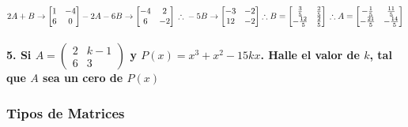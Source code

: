 \documentclass[
]{article}
\begin{document}
\[
2A + B \rightarrow \begin{bmatrix}1&-4\\6&0\end{bmatrix} - 2A-6B\rightarrow\begin{bmatrix}-4&2\\6&-2\end{bmatrix}
\\ \therefore \\
-5B \rightarrow\begin{bmatrix}
    -3&-2\\12&-2
\end{bmatrix} \therefore B = \begin{bmatrix}
    \frac{3}{5} & \frac{2}{5} \\
    -\frac{12}{5} & \frac{2}{5}
\end{bmatrix}
\\ \therefore \\
A = \begin{bmatrix}
    -\frac{1}{5} & \frac{11}{5} \\
    -\frac{21}{5} & -\frac{14}{5}
\end{bmatrix}
\]

\hypertarget{si-a-beginpmatrix-2-k-1-6-3-endpmatrix-y-px-x3-x2---15kx.-halle-el-valor-de-k-tal-que-a-sea-un-cero-de-px}{%
\paragraph{\texorpdfstring{5. Si
\(A = \begin{pmatrix} 2 & k-1 \\ 6 & 3 \end{pmatrix}\) y
\(P(x) = x^3 + x^2 - 15kx\). Halle el valor de \(k\), tal que \(A\) sea
un cero de
\(P(x)\)}{5. Si A = \textbackslash begin\{pmatrix\} 2 \& k-1 \textbackslash\textbackslash{} 6 \& 3 \textbackslash end\{pmatrix\} y P(x) = x\^{}3 + x\^{}2 - 15kx. Halle el valor de k, tal que A sea un cero de P(x)}}\label{si-a-beginpmatrix-2-k-1-6-3-endpmatrix-y-px-x3-x2---15kx.-halle-el-valor-de-k-tal-que-a-sea-un-cero-de-px}}

\hypertarget{tipos-de-matrices}{%
\subsubsection{Tipos de Matrices}\label{tipos-de-matrices}}
\end{document}
